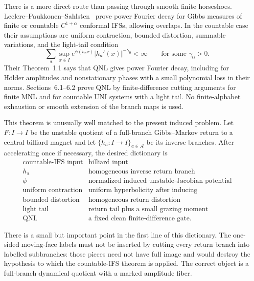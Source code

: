 \documentclass[11pt]{article}
\begin{document}
There is a more direct route than passing through smooth finite horseshoes.
Leclerc--Paukkonen--Sahlsten~\cite{LPS} prove power Fourier decay for Gibbs measures of
finite or countable $C^{1+\alpha}$ conformal IFSs, allowing overlaps.  In the
countable case their assumptions are uniform contraction, bounded distortion,
summable variations, and the light-tail condition
\begin{equation}
\label{eq:lps-light-tail}
 \sum_{a}\sup_{x\in I}
 e^{\phi(h_a x)}|h_a'(x)|^{-\gamma_0}<\infty
 \qquad\text{for some }\gamma_0>0.
\end{equation}
Their Theorem~1.1 says that QNL gives power Fourier decay, including for
H\"older amplitudes and nonstationary phases with a small polynomial loss in
their norms.  Sections~6.1--6.2 prove QNL by finite-difference cutting
arguments for finite MNL and for countable UNI systems with a light tail.  No
finite-alphabet exhaustion or smooth extension of the branch maps is used.

This theorem is unusually well matched to the present induced problem.  Let
$F:I\to I$ be the unstable quotient of a full-branch Gibbs--Markov return to
a central billiard magnet and let $\{h_a:I\to I\}_{a\in\mathcal A}$ be its
inverse branches.  After accelerating once if necessary, the desired
dictionary is
\begin{equation}
\label{eq:lps-dictionary}
 \begin{array}{c|c}
 \text{countable-IFS input}&\text{billiard input}\\ \hline
 h_a&\text{homogeneous inverse return branch}\\
 \phi&\text{normalized induced unstable-Jacobian potential}\\
 \text{uniform contraction}&\text{uniform hyperbolicity after inducing}\\
 \text{bounded distortion}&\text{homogeneous return distortion}\\
 \text{light tail}&\text{return tail plus a small grazing moment}\\
 \text{QNL}&\text{a fixed clean finite-difference gate}.
 \end{array}
\end{equation}

There is a small but important point in the first line of this dictionary.
The one-sided moving-face labels must not be inserted by cutting every return
branch into labelled subbranches: those pieces need not have full image and
would destroy the hypothesis to which the countable-IFS theorem is applied.
The correct object is a full-branch dynamical quotient with a marked amplitude
fiber.
\end{document}

